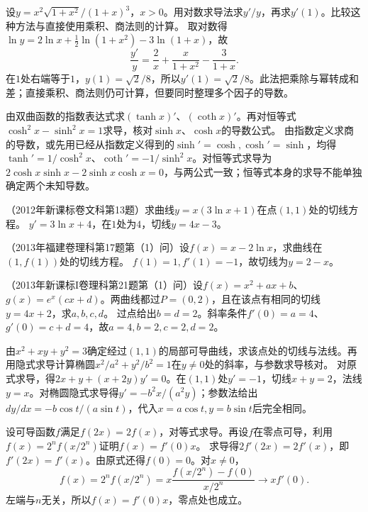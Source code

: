 设\(y=x^2\sqrt{1+x^2}/(1+x)^3\)，\(x>0\)。用对数求导法求\(y'/y\)，再求\(y'(1)\)。比较这种方法与直接使用乘积、商法则的计算。
\solutionanswer
取对数得\(\ln y=2\ln x+\frac12\ln(1+x^2)-3\ln(1+x)\)，故
\[
 \frac{y'}y=\frac2x+\frac{x}{1+x^2}-\frac3{1+x}.
\]
在\(1\)处右端等于\(1\)，\(y(1)=\sqrt2/8\)，所以\(y'(1)=\sqrt2/8\)。此法把乘除与幂转成和差；直接乘积、商法则仍可计算，但要同时整理多个因子的导数。


由双曲函数的指数表达式求\((\tanh x)'\)、\((\coth x)'\)。再对恒等式\(\cosh^2x-\sinh^2x=1\)求导，核对\(\sinh x\)、\(\cosh x\)的导数公式。
\solutionanswer
由指数定义求商的导数，或先用已经从指数定义得到的\(\sinh' =\cosh,\cosh'=\sinh\)，均得\(\tanh'=1/\cosh^2x\)、\(\coth'=-1/\sinh^2x\)。对恒等式求导为\(2\cosh x\sinh x-2\sinh x\cosh x=0\)，与两公式一致；恒等式本身的求导不能单独确定两个未知导数。


（2012年新课标卷文科第13题）求曲线\(y=x(3\ln x+1)\)在点\((1,1)\)处的切线方程。
\solutionanswer
\(y'=3\ln x+4\)，在\(1\)处为\(4\)，切线\(y=4x-3\)。


（2013年福建卷理科第17题第（1）问）设\(f(x)=x-2\ln x\)，求曲线在\((1,f(1))\)处的切线方程。
\solutionanswer
\(f(1)=1,f'(1)=-1\)，故切线为\(y=2-x\)。


（2013年新课标I卷理科第21题第（1）问）设\(f(x)=x^2+ax+b\)、\(g(x)=e^x(cx+d)\)。两曲线都过\(P=(0,2)\)，且在该点有相同的切线\(y=4x+2\)，求\(a,b,c,d\)。
\solutionanswer
过点给出\(b=d=2\)。斜率条件\(f'(0)=a=4\)、\(g'(0)=c+d=4\)，故\(a=4,b=2,c=2,d=2\)。


由\(x^2+xy+y^2=3\)确定经过\((1,1)\)的局部可导曲线，求该点处的切线与法线。再用隐式求导计算椭圆\(x^2/a^2+y^2/b^2=1\)在\(y\ne0\)处的斜率，与参数求导核对。
\solutionanswer
对原式求导，得\(2x+y+(x+2y)y'=0\)。在\((1,1)\)处\(y'=-1\)，切线\(x+y=2\)，法线\(y=x\)。对椭圆隐式求导得\(y'=-b^2x/(a^2y)\)；参数法给出\(dy/dx=-b\cos t/(a\sin t)\)，代入\(x=a\cos t,y=b\sin t\)后完全相同。


设可导函数\(f\)满足\(f(2x)=2f(x)\)，对等式求导。再设\(f\)在零点可导，利用\(f(x)=2^nf(x/2^n)\)证明\(f(x)=f'(0)x\)。
\solutionanswer
求导得\(2f'(2x)=2f'(x)\)，即\(f'(2x)=f'(x)\)。由原式还得\(f(0)=0\)。对\(x\ne0\)，
\[
 f(x)=2^nf(x/2^n)=x\frac{f(x/2^n)-f(0)}{x/2^n}\longrightarrow xf'(0).
\]
左端与\(n\)无关，所以\(f(x)=f'(0)x\)，零点处也成立。


